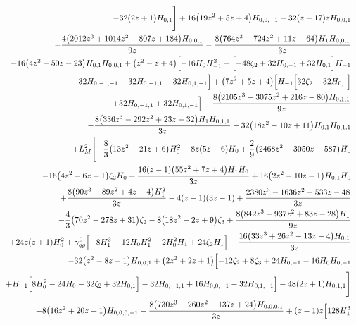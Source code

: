 \begin{eqnarray}
\nonumber \\ &&
-32 (2 z+1) H_{0,1}\Biggr]+16 \big(19 z^2+5 z+4\big) H_{0,0,-1}-32  (z-17)z H_{0,0,1}
\nonumber \\ &&
-\frac{4 \big(2012 z^3+1014  z^2-807 z+184\big) H_{0,0,1}}{9 z}-\frac{8 \big(764 z^3-724 z^2+11 z-64\big)  H_1 H_{0,0,1}}{3 z}
\nonumber \\ &&
-16 \big(4 z^2-50 z-23\big) H_{0,1}H_{0,0,1}+\big(z^2-z+4\big) \Bigl[-16 H_0 H_{-1}^2+\Bigl[-48 \zeta_2+32H_{0,-1}
+32 H_{0,1}\Bigr] H_{-1}
\nonumber \\ &&
-32 H_{0,-1,-1}-32 H_{0,-1,1}-32 H_{0,1,-1}\Bigr]+\big(7 z^2+5 z+4\big)\Bigl[H_{-1} \Bigl[32  \zeta_2-32  H_{0,1}\Bigr]
\nonumber \\ &&
+32  H_{0,-1,1}+32 H_{0,1,-1}\Bigr]-\frac{8 \big(2105 z^3-3075 z^2+216 z-80\big) H_{0,1,1}}{9  z}
\nonumber \\ &&
-\frac{8 \big(336 z^3-292 z^2+23 z-32\big) H_1 H_{0,1,1}}{3 z}-32 \big(18z^2-10 z+11\big) H_{0,1} H_{0,1,1}
\nonumber \\ &&
+L_M^2 \Biggl[-\frac{8}{3} \big(13 z^2+21 z+6\big)H_0^2-8  z (5 z-6) H_0+\frac{2}{9} \big(2468 z^2-3050 z-587\big) H_0
\nonumber \\ &&
-16\big(4 z^2-6 z+1\big) \zeta_2 H_0+\frac{16 (z-1) \big(55 z^2+7 z+4\big)  H_1 H_0}{3 z}+16 \big(2 z^2-10 z-1\big) H_{0,1} H_0
\nonumber \\ &&
+\frac{8 \big(90 z^3-89 z^2+4 z-4\big) H_1^2}{3 z}-4  (z-1) (3z-1)+\frac{2380 z^3-1636 z^2-533 z-48}{3 z}
\nonumber \\ &&
-\frac{4}{3} \big(70 z^2-278 z+31\big) \zeta_2-8 \big(18 z^2-2z+9\big) \zeta_3
+\frac{8 \big(842 z^3-937 z^2+83  z-28\big) H_1}{9 z}
\nonumber \\ &&
+24 z (z+1) H_0^2
+{\gamma}_{qg}^{0} \Bigl[-8 H_1^3-12 H_0 H_1^2-2H_0^2 H_1+24 \zeta_2 H_1\Bigr]-\frac{16 \big(33 z^3+26 z^2-13 z-4\big)  H_{0,1}}{3 z}
\nonumber \\ &&
-32 \big(z^2-8 z-1\big) H_{0,0,1}+\big(2 z^2+2 z+1\big)\Bigl[-12  \zeta_2+8  \zeta_3+24  H_{0,-1}
-16 H_0 H_{0,-1}
\nonumber \\ &&
+H_{-1} \Bigl[8  H_0^2-24  H_0-32 \zeta_2+32  H_{0,1}\Bigr]
-32  H_{0,-1,1}+16 H_{0,0,-1}-32  H_{0,1,-1}\Bigr]-48 (2 z+1) H_{0,1,1}\Biggr]
\nonumber \\ &&
-8 \big(16z^2+20 z+1\big) H_{0,0,0,-1}-\frac{8 \big(730 z^3-260 z^2-137 z+24\big)  H_{0,0,0,1}}{3 z}+(z-1) z \Bigl[128  H_1^3
\nonumber \\ &&

\end{eqnarray}
